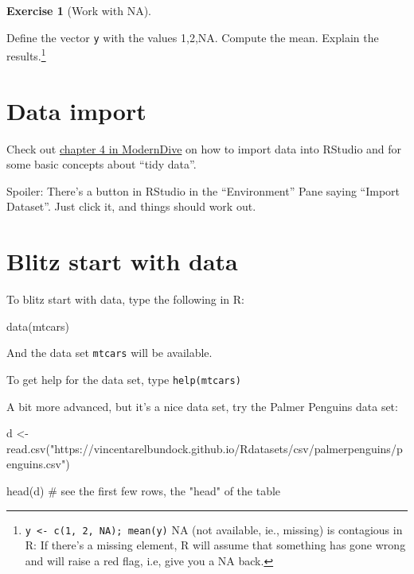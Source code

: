 \documentclass[
  letterpaper,
  DIV=11,
  numbers=noendperiod]{scrreprt}
\newenvironment{Shaded}{\begin{snugshade}}{\end{snugshade}}
\newcommand{\CommentTok}[1]{\textcolor[rgb]{0.37,0.37,0.37}{#1}}
\newcommand{\FunctionTok}[1]{\textcolor[rgb]{0.28,0.35,0.67}{#1}}
\newcommand{\NormalTok}[1]{\textcolor[rgb]{0.00,0.23,0.31}{#1}}
\newcommand{\OtherTok}[1]{\textcolor[rgb]{0.00,0.23,0.31}{#1}}
\newcommand{\StringTok}[1]{\textcolor[rgb]{0.13,0.47,0.30}{#1}}
\theoremstyle{definition}
\newtheorem{exercise}{Exercise}[chapter]
\theoremstyle{definition}
\theoremstyle{remark}
\begin{document}
\leavevmode{}%
\begin{exercise}[Work with NA]\label{exr-q9}

Define the vector \texttt{y} with the values 1,2,NA. Compute the mean.
Explain the results.\footnote{\texttt{y\ \textless{}-\ c(1,\ 2,\ NA);\ mean(y)}
  NA (not available, ie., missing) is contagious in R: If there's a
  missing element, R will assume that something has gone wrong and will
  raise a red flag, i.e, give you a NA back.}

\end{exercise}

\hypertarget{data-import}{%
\section{Data import}\label{data-import}}

Check out \href{https://moderndive.com/4-tidy.html}{chapter 4 in
ModernDive} on how to import data into RStudio and for some basic
concepts about ``tidy data''.

Spoiler: There's a button in RStudio in the ``Environment'' Pane saying
``Import Dataset''. Just click it, and things should work out.

\hypertarget{sec-blitz-data}{%
\section{Blitz start with data}\label{sec-blitz-data}}

To blitz start with data, type the following in R:

\begin{Shaded}
\begin{Highlighting}[]
\FunctionTok{data}\NormalTok{(mtcars)}
\end{Highlighting}
\end{Shaded}

And the data set \texttt{mtcars} will be available.

To get help for the data set, type \texttt{help(mtcars)}

A bit more advanced, but it's a nice data set, try the Palmer Penguins
data set:

\begin{Shaded}
\begin{Highlighting}[]
\NormalTok{d }\OtherTok{\textless{}{-}} \FunctionTok{read.csv}\NormalTok{(}\StringTok{"https://vincentarelbundock.github.io/Rdatasets/csv/palmerpenguins/penguins.csv"}\NormalTok{)}

\FunctionTok{head}\NormalTok{(d)  }\CommentTok{\# see the first few rows, the "head" of the table}
\end{Highlighting}
\end{Shaded}
\end{document}
